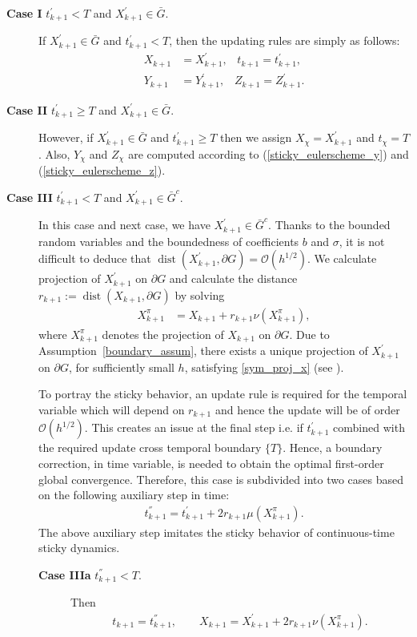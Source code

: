 \documentclass{article}
\theoremstyle{definition}
\DeclareMathOperator{\dist}{dist}
\numberwithin{equation}{section}
\begin{document}
\begin{description}
     \item[\textbf{Case I} $t^{'}_{k+1} < T$ and $X^{'}_{k+1} \in \bar{G}$. ]
     If $X_{k+1}^{'} \in \bar{G}$ and $t_{k+1}^{'} < T$, then the updating rules are simply as follows:  
\begin{align}
X_{k+1} &= X_{k+1}^{'}, \;\;\; 
t_{k+1} = t_{k+1}^{'}, \label{sticky_eqn_3.5}\\ 
Y_{k+1} &= Y_{k+1}^{'}, \;\;\;
Z_{k+1} = Z_{k+1}^{'}. \label{sticky_eqn_3.6}
\end{align}
 \item[\textbf{Case II} $t^{'}_{k+1} \geq T$ and $X^{'}_{k+1} \in \bar{G}$. ]
 However, if $X_{k+1}^{'} \in \bar{G}$ and $t_{k+1}^{'} \geq T$ then we assign $X_{\chi} = X_{k+1}^{'}$ and $ t_\chi = T$. Also, $Y_{\chi} $ and $Z_{\chi}$ are computed according to (\ref{sticky_eulerscheme_y}) and (\ref{sticky_eulerscheme_z}). 


 \item[\textbf{Case III} $t^{'}_{k+1} < T$ and $X^{'}_{k+1} \in \bar{G}^c$. ]
  In this case and next case, we have $X_{k+1}^{'} \in \bar{G}^c$.  Thanks to the bounded random variables and the boundedness of coefficients $b$ and $\sigma$, it is not difficult to deduce that $\dist(X_{k+1}^{'}, \partial G) = \mathcal{O}(h^{1/2})$.
   We calculate projection of $X_{k +1}^{'}$ on $\partial G $ and calculate the distance $r_{k+1} := \dist(X_{k+1}, \partial G)$ by solving
\begin{align}
X_{k+1}^{\pi} &= X_{k +1} + r_{k+1}\nu(X_{k+1}^{\pi}),\label{sym_proj_x}
\end{align}
where $X_{k+1}^{\pi}$ denotes the projection of $X_{k+1}$ on $\partial G $.  Due to Assumption~\ref{boundary_assum}, there exists a unique projection of $X_{k+1}^{'}$ on $\partial G$, for sufficiently small $h$, satisfying \eqref{sym_proj_x} (see \cite{2}).  

To portray the sticky behavior, an update rule is required for the temporal variable which will depend on $r_{k+1}$ and hence the update will be of order $\mathcal{O}(h^{1/2})$. This creates an issue at the final step i.e. if $t_{k+1}^{'}$ combined with the required update cross temporal boundary $\{T\}$. 
Hence, a boundary correction, in time variable, is needed to obtain the optimal first-order global convergence. Therefore, this case is subdivided into two cases based on the following auxiliary step in time:
 \begin{align}\label{checking_t''}
     t^{''}_{k+1} = t_{k+1}^{'} + 2 r_{k+1}\mu(X^{\pi}_{k+1}).
 \end{align}
 The above auxiliary step imitates the sticky behavior of continuous-time sticky dynamics. 
\begin{description}
    \item[ \textbf{Case IIIa} $t^{''}_{k+1} < T $. ] Then 
    \begin{align}\label{sticky_case3a_eqn_1}
        t_{k+1} = t^{''}_{k+1}, \quad \quad
        X_{k+1} = X_{k+1}^{'} + 2 r_{k+1}\nu(X^{\pi}_{k+1}). 
    \end{align}


\end{description}
\end{description}
\end{document}
